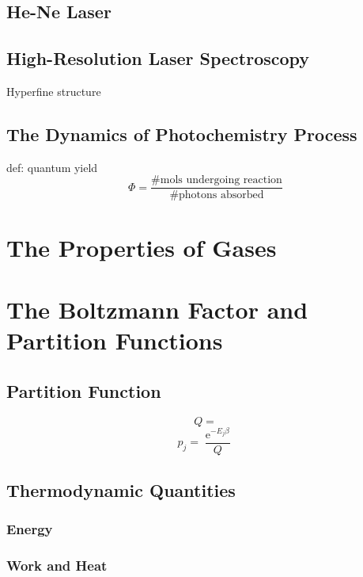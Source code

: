 \documentclass[a4paper]{article}
\DeclareMathOperator{\e}{\mathrm{e}}
\numberwithin{equation}{section}
\begin{document}
\subsection{He-Ne Laser}
\subsection{High-Resolution Laser Spectroscopy}
Hyperfine structure
\subsection{The Dynamics of Photochemistry Process}
def: quantum yield
\begin{equation}\label{key}
\Phi = \dfrac{\text{\# mols undergoing reaction}}{\text{\# photons absorbed}}
\end{equation}

\section{The Properties of Gases}

\section{The Boltzmann Factor and Partition Functions}
\subsection{}
\subsection{Partition Function}
\begin{equation}\label{key}
Q = 
\end{equation}
\begin{equation}\label{key}
p_j = \dfrac{\e^{-E_j\beta}}{Q}
\end{equation}

\subsection{Thermodynamic Quantities}
\subsubsection{Energy}

\subsubsection{Work and Heat}
\end{document}
